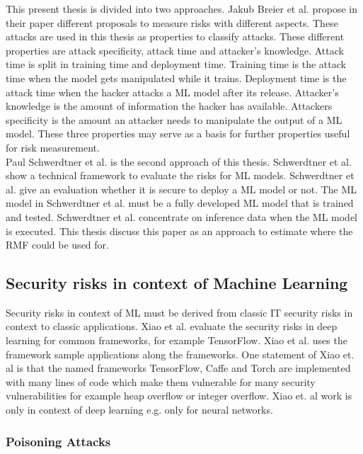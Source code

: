 This present thesis is divided into two approaches. Jakub Breier et al. \cite{DBLP:journals/corr/abs-2012-04884} propose in their paper different proposals to measure risks with different
aspects. These attacks are used in this thesis as properties to classify attacks. These different properties are attack specificity, attack time and attacker's knowledge. Attack time is
split in training time and deployment time. Training time is the attack time when the model gets manipulated while it trains. Deployment time is the attack time when the hacker attacks a
ML model after its release. Attacker's knowledge is the amount of information the hacker has available. Attackers specificity is the amount an attacker needs to manipulate the output of a
ML model. These three properties may serve as a basis for further properties useful for risk measurement. \\
Paul Schwerdtner et al. \cite{DBLP:journals/corr/abs-2011-04328} is the second approach of this thesis. Schwerdtner et al. show a technical framework to evaluate the risks for ML models.
Schwerdtner et al. give an evaluation whether it is secure to deploy a ML model or not. The ML model in Schwerdtner et al. must be a fully developed ML model that is trained and tested.
Schwerdtner et al. concentrate on inference data when the ML model is executed. This thesis discuss this paper as an approach to estimate where the RMF could be used for.

\subsection{Security risks in context of Machine Learning}

Security risks in context of ML must be derived from classic IT security risks in context to classic applications. Xiao et al. \cite{DBLP:conf/sp/XiaoLZX18} evaluate the security risks in
deep learning for common frameworks, for example TensorFlow. Xiao et al. uses the framework sample applications along the frameworks. One statement of Xiao et. al is that the named
frameworks TensorFlow, Caffe and Torch are implemented with many lines of code which make them vulnerable for many security vulnerabilities for example heap overflow or integer overflow.
Xiao et. al work is only in context of deep learning e.g. only for neural networks.

\subsubsection*{Poisoning Attacks}


